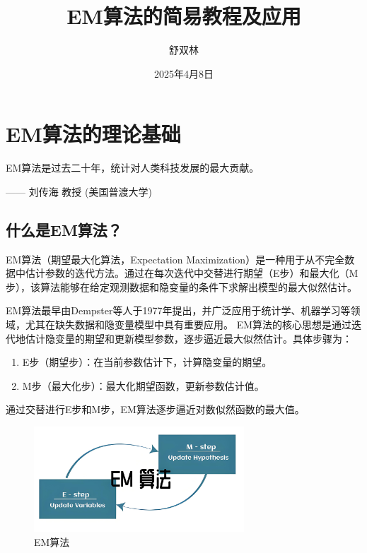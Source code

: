 \documentclass[a4paper,12pt]{ctexart} %
\author{\kaishu 舒双林}
\title{\kaishu EM算法的简易教程及应用}
\date{2025年4月8日}
\begin{document}
\maketitle

\tableofcontents
\newpage

\section{EM算法的理论基础}
\setcounter{page}{1}
\begin{flushleft}
    {\kaishu EM算法是过去二十年，统计对人类科技发展的最大贡献。}
    \end{flushleft}
    \begin{flushright}
    {\kaishu —— 刘传海 教授 (美国普渡大学)}
    \end{flushright}
\subsection{什么是EM算法？}
EM算法（期望最大化算法，Expectation Maximization）是一种用于从不完全数据中估计参数的迭代方法。通过在每次迭代中交替进行期望（E步）和最大化（M步），该算法能够在给定观测数据和隐变量的条件下求解出模型的最大似然估计。

EM算法最早由Dempster等人于1977年提出，并广泛应用于统计学、机器学习等领域，尤其在缺失数据和隐变量模型中具有重要应用。
EM算法的核心思想是通过迭代地估计隐变量的期望和更新模型参数，逐步逼近最大似然估计。具体步骤为：
\begin{enumerate}
    \item E步（期望步）：在当前参数估计下，计算隐变量的期望。
    \item M步（最大化步）：最大化期望函数，更新参数估计值。
\end{enumerate}
通过交替进行E步和M步，EM算法逐步逼近对数似然函数的最大值。
\begin{figure}[H]
    \centering
    \includegraphics[width=0.7\textwidth]{fig/EM算法.jpg}
    \caption{EM算法}
    \label{fig:em_flowchart}
\end{figure}
\end{document}

